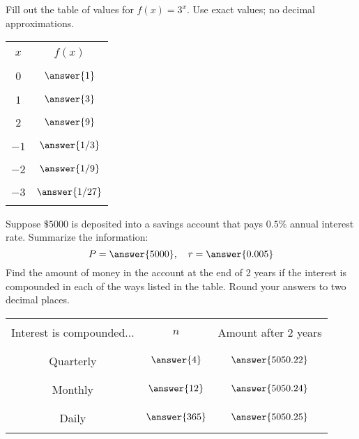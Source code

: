 \documentclass{ximera}
\begin{document}
\begin{problem}\label{prob:160hom7prob3}
Fill out the table of values for $f(x)=3^x$.  Use exact values; no decimal approximations.
\begin{center}
\begin{tabular}{|c|c|}
 \hline
 &   \\
 $x$& $f(x)$ \\
 &  \\
  \hline
  &  \\
 $0$ & $\answer{1}$ \\
  & \\
 \hline
  & \\
 $1$ & $\answer{3}$ \\
  & \\
 \hline
  & \\
  $2$ & $\answer{9}$  \\
  & \\
 \hline
 & \\
  $-1$ & $\answer{1/3}$  \\
  & \\
 \hline
 & \\
  $-2$ & $\answer{1/9}$  \\
  & \\
 \hline
 & \\
  $-3$ & $\answer{1/27}$  \\
  & \\
 \hline
 \end{tabular}
\end{center}    
\end{problem}


 
  \begin{problem}\label{prob:160hom7prob4} 
  Suppose $\$5000$ is deposited into a savings account that pays $0.5\%$ annual interest rate.  
  Summarize the information:
  $$P=\answer{5000},\quad r=\answer{0.005}$$
  Find the amount of money in the account at the end of 2 years if the interest is compounded in each of the ways listed in the table.  Round your answers to two decimal places.
  \begin{center}
\begin{tabular}{|c|c|c|}
 \hline
 &&   \\
 Interest is compounded... & $n$ & Amount after 2 years \\
 &&  \\
  \hline
  &&  \\
 Quarterly & $\answer{4}$ & $\answer{5050.22}$ \\
  && \\
 \hline
  &&  \\
 Monthly & $\answer{12}$ & $\answer{5050.24}$ \\
  && \\
 \hline
  &&  \\
 Daily & $\answer{365}$ & $\answer{5050.25}$ \\
  && \\
 \hline
 \end{tabular}
\end{center}    
  \end{problem}
  
\end{document}
